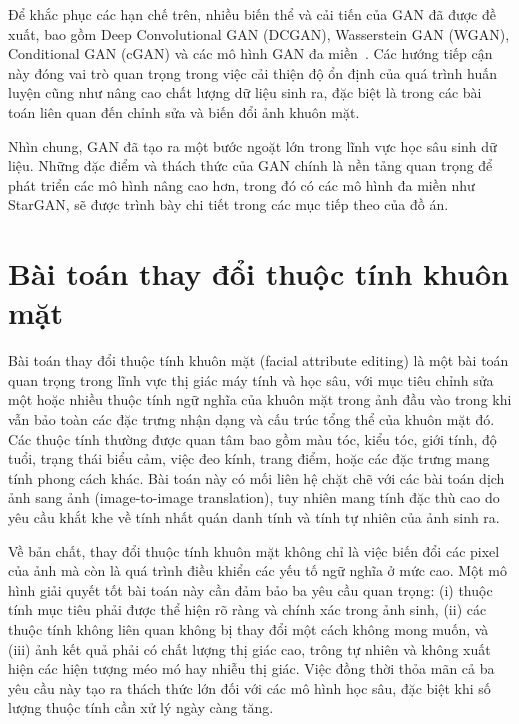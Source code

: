 \documentclass[../DoAn.tex]{subfiles}
\begin{document}
Để khắc phục các hạn chế trên, nhiều biến thể và cải tiến của GAN đã được đề xuất, bao gồm Deep Convolutional GAN (DCGAN), Wasserstein GAN (WGAN), Conditional GAN (cGAN) và các mô hình GAN đa miền~\cite{tenYearsGANsSurvey2023}. Các hướng tiếp cận này đóng vai trò quan trọng trong việc cải thiện độ ổn định của quá trình huấn luyện cũng như nâng cao chất lượng dữ liệu sinh ra, đặc biệt là trong các bài toán liên quan đến chỉnh sửa và biến đổi ảnh khuôn mặt.

Nhìn chung, GAN đã tạo ra một bước ngoặt lớn trong lĩnh vực học sâu sinh dữ liệu. Những đặc điểm và thách thức của GAN chính là nền tảng quan trọng để phát triển các mô hình nâng cao hơn, trong đó có các mô hình đa miền như StarGAN, sẽ được trình bày chi tiết trong các mục tiếp theo của đồ án.







\section{Bài toán thay đổi thuộc tính khuôn mặt}
\label{section:2.3}

Bài toán thay đổi thuộc tính khuôn mặt (facial attribute editing) là một bài toán quan trọng trong lĩnh vực thị giác máy tính và học sâu, với mục tiêu chỉnh sửa một hoặc nhiều thuộc tính ngữ nghĩa của khuôn mặt trong ảnh đầu vào trong khi vẫn bảo toàn các đặc trưng nhận dạng và cấu trúc tổng thể của khuôn mặt đó. Các thuộc tính thường được quan tâm bao gồm màu tóc, kiểu tóc, giới tính, độ tuổi, trạng thái biểu cảm, việc đeo kính, trang điểm, hoặc các đặc trưng mang tính phong cách khác. Bài toán này có mối liên hệ chặt chẽ với các bài toán dịch ảnh sang ảnh (image-to-image translation), tuy nhiên mang tính đặc thù cao do yêu cầu khắt khe về tính nhất quán danh tính và tính tự nhiên của ảnh sinh ra.

Về bản chất, thay đổi thuộc tính khuôn mặt không chỉ là việc biến đổi các pixel của ảnh mà còn là quá trình điều khiển các yếu tố ngữ nghĩa ở mức cao. Một mô hình giải quyết tốt bài toán này cần đảm bảo ba yêu cầu quan trọng: (i) thuộc tính mục tiêu phải được thể hiện rõ ràng và chính xác trong ảnh sinh, (ii) các thuộc tính không liên quan không bị thay đổi một cách không mong muốn, và (iii) ảnh kết quả phải có chất lượng thị giác cao, trông tự nhiên và không xuất hiện các hiện tượng méo mó hay nhiễu thị giác. Việc đồng thời thỏa mãn cả ba yêu cầu này tạo ra thách thức lớn đối với các mô hình học sâu, đặc biệt khi số lượng thuộc tính cần xử lý ngày càng tăng.
\end{document}
